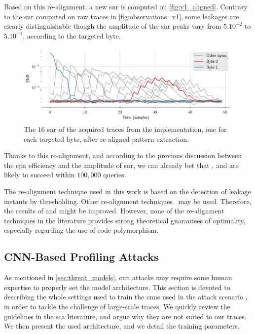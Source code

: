 Based on this re-alignment, a new \gls{snr} is computed on \autoref{fig:v1_aligned}.
Contrary to the \gls{snr} computed on raw traces in \autoref{fig:observations_v1}, some leakages are clearly distinguishable though the amplitude of the \gls{snr} peaks vary from \(5.10^{-2}\) to \(5.10^{-1}\), according to the targeted byte.
\begin{figure}[t]
	\centering
	\includegraphics[width=\textwidth]{../Chapter3/CLAPS/v1/snr_aligned}
	\caption{The \(16\) \gls{snr} of the acquired traces from the \mbedTLS{} implementation, one for each targeted byte, after re-aligned pattern extraction.}
	\label{fig:v1_aligned}
\end{figure}
Thanks to this re-alignment, and according to the previous discussion between the \gls{cpa} efficiency and the amplitude of \gls{snr}, we can already bet that \attCPASync{}, \attLDASync{} and \attCNN{} are likely to succeed within \(100,000\) queries.

\begin{remark}
	The re-alignment technique used in this work is based on the detection of leakage instants by thresholding.
	Other re-alignment techniques~\cite{nagashima_dpa_2007,van_woudenberg_improving_2011,durvaux_efficient_2012} may be used.
	Therefore, the results of \attCPASync{} and \attLDASync{} might be improved.
	However, none of the re-alignment techniques in the literature provides strong theoretical guarantees of optimality, especially regarding the use of code polymorphism.
\end{remark}


\subsection{CNN-Based Profiling Attacks}
\label{sec:cnn_archi_esorics}
As mentioned in \autoref{sec:threat_models}, \gls{cnn} attacks may require some human expertise to properly set the model architecture.
This section is devoted to describing the whole settings used to train the \glspl{cnn} used in the attack scenario \attCNN{}, in order to tackle the challenge of large-scale traces.
We quickly review the guidelines in the \gls{sca} literature, and argue why they are not suited to our traces.
We then present the used architecture, and we detail the training parameters.


